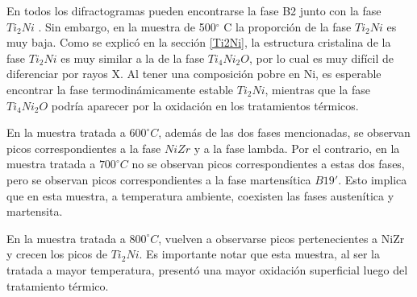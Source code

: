 \documentclass[12pt]{article}
\theoremstyle{definition}
\theoremstyle{remark}
\begin{document}
{En todos los difractogramas pueden encontrarse la fase B2 junto con la fase $Ti_2Ni$ . Sin embargo, en la muestra de 500$^\circ$ C la proporción de la fase $Ti_2 Ni$ es muy baja. Como se explicó en la sección \ref{Ti2Ni}, la estructura cristalina de la fase $Ti_2 Ni$ es muy similar a la de la fase $Ti_4Ni_2O$, por lo cual es muy difícil de diferenciar por rayos X. Al tener una composición pobre en Ni, es esperable encontrar la fase termodinámicamente estable $Ti_2 Ni$, mientras que la fase $Ti_4Ni_2O$ podría aparecer por la oxidación en los tratamientos térmicos.

En la muestra tratada a $600 ^\circ C$, además de las dos fases mencionadas, se observan picos correspondientes a la fase $NiZr$ y a la fase lambda. Por el contrario, en la muestra tratada a $700 ^\circ C$ no se observan picos correspondientes a estas dos fases, pero se observan picos correspondientes a la fase martensítica $B19'$. Esto implica que en esta muestra, a temperatura ambiente, coexisten las fases austenítica y martensita.

En la muestra tratada a $800 ^\circ C$, vuelven a observarse picos pertenecientes a NiZr y crecen los picos de $Ti_2 Ni$. Es importante notar que esta muestra, al ser la tratada a mayor temperatura, presentó una mayor oxidación superficial luego del tratamiento térmico. 

}
\end{document}
